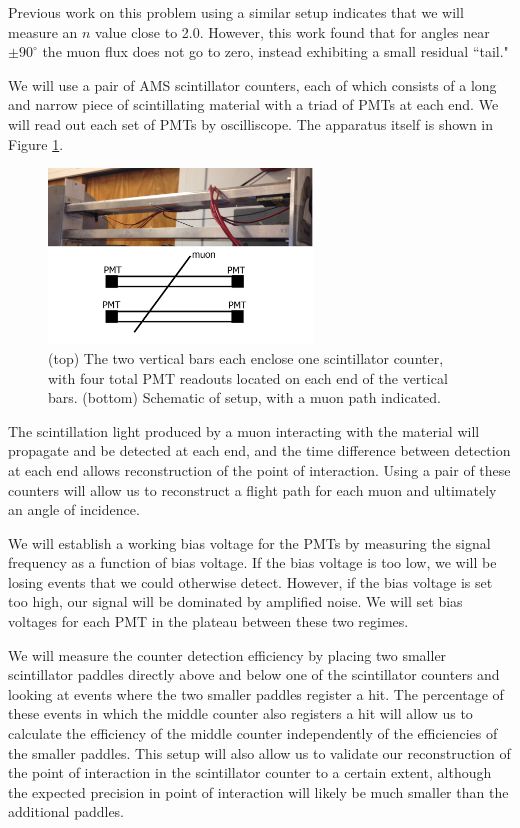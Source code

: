 Previous work on this problem using a similar setup \cite{kuo} indicates that we will measure an $n$ value close to 2.0. However, this work found that for angles near $\pm90^\circ$ the muon flux does not go to zero, instead exhibiting a small residual ``tail." 

We will use a pair of AMS scintillator counters, each of which consists of a long and narrow piece of scintillating material with a triad of PMTs at each end. We will read out each set of PMTs by oscilliscope. The apparatus itself is shown in Figure \ref{fig:apparatus}.

\begin{figure}[htb]
\includegraphics[width=7cm]{apparatus2.JPG}
\caption{(top) The two vertical bars each enclose one scintillator counter, with four total PMT readouts located on each end of the vertical bars. (bottom) Schematic of setup, with a muon path indicated. }
\label{fig:apparatus}
\end{figure}

The scintillation light produced by a muon interacting with the material will propagate and be detected at each end, and the time difference between detection at each end allows reconstruction of the point of interaction. Using a pair of these counters will allow us to reconstruct a flight path for each muon and ultimately an angle of incidence.

We will establish a working bias voltage for the PMTs by measuring the signal frequency as a function of bias voltage. If the bias voltage is too low, we will be losing events that we could otherwise detect. However, if the bias voltage is set too high, our signal will be dominated by amplified noise. We will set bias voltages for each PMT in the plateau between these two regimes.

We will measure the counter detection efficiency by placing two smaller scintillator paddles directly above and below one of the scintillator counters and looking at events where the two smaller paddles register a hit. The percentage of these events in which the middle counter also registers a hit will allow us to calculate the efficiency of the middle counter independently of the efficiencies of the smaller paddles. This setup will also allow us to validate our reconstruction of the point of interaction in the scintillator counter to a certain extent, although the expected precision in point of interaction will likely be much smaller than the additional paddles.

